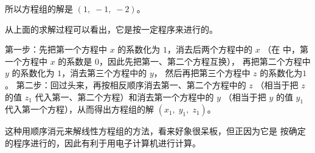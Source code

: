 所以方程组的解是 $(1,\; -1,\; -2)$。

从上面的求解过程可以看出，它是按一定程序来进行的。

第一步：先把第一个方程中 $x$ 的系数化为 $1$，消去后两个方程中的 $x$
（在  中，第一个方程中 $x$ 的系数是 $0$，因此先把第一、第二个方程互换），
再把第二个方程中 $y$ 的系数化为 $1$，消去第三个方程中的 $y$，
然后再把第三个方程中 $z$ 的系数化为$1$。
第二步：回过头来，再按相反顺序消去第一、第二个方程中的 $z$
（相当于把 $z$ 的值 $z_1$ 代入第一、第二个方程）和消去第一个方程中的 $y$
（相当于把 $y$ 的值 $y_1$ 代入第一个方程），从而得出方程组的解 $(x_1,\; y_1,\; z_1)$。

这种用顺序消元来解线性方程组的方法，看来好象很呆板，但正因为它是
按确定的程序进行的，因此有利于用电子计算机进行计算。

